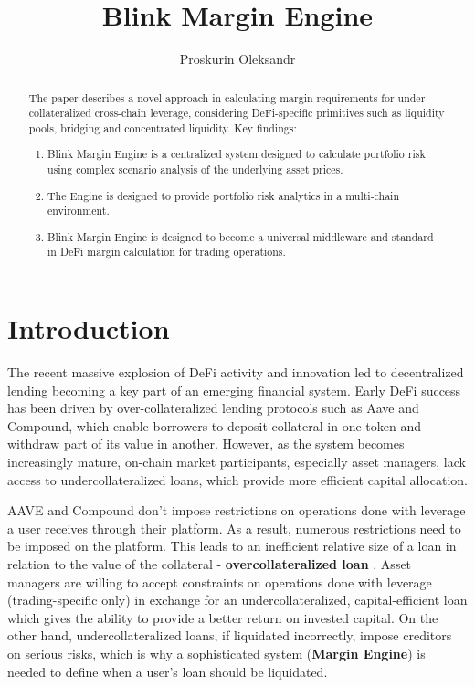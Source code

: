 \documentclass[conference]{IEEEtran}
\begin{document}
 
\title{Blink Margin Engine}
\author{Proskurin Oleksandr}

\maketitle
    \begin{abstract}
The paper describes a novel approach in calculating margin requirements for under-collateralized cross-chain leverage, considering DeFi-specific primitives such as liquidity pools, bridging and concentrated liquidity. 
Key findings: 
\begin{enumerate}
  \item Blink Margin Engine is a centralized system designed to calculate portfolio risk using complex scenario analysis of the underlying asset prices.
  \item The Engine is designed to provide portfolio risk analytics in a multi-chain environment. 
  \item Blink Margin Engine is designed to become a universal middleware and standard in DeFi margin calculation for trading operations.
  \end{enumerate}
\end{abstract}





\section{Introduction}
The recent massive explosion of DeFi activity and innovation led to decentralized lending becoming a key part of an emerging financial system. Early DeFi success has been driven by over-collateralized lending protocols such as Aave and Compound, which enable borrowers to deposit collateral in one token and withdraw part of its value in another. However, as the system becomes increasingly mature, on-chain market participants, especially asset managers, lack access to undercollateralized loans, which provide more efficient capital allocation.

AAVE and Compound don't impose restrictions on operations done with leverage a user receives through their platform. As a result, numerous restrictions need to be imposed on the platform. This leads to an inefficient relative size of a loan in relation to the value of the collateral - \textbf {overcollateralized loan} \cite{aave-whitepaper} \cite{compound-whitepaper}. Asset managers are willing to accept constraints on operations done with leverage (trading-specific only) in exchange for an undercollateralized, capital-efficient loan which gives the ability to provide a better return on invested capital. On the other hand, undercollateralized loans, if liquidated incorrectly, impose creditors on serious risks, which is why a sophisticated system (\textbf {Margin Engine}) is needed to define when a user's loan should be liquidated. 
\end{document}
